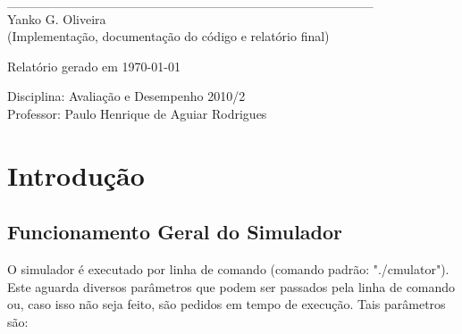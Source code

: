 \documentclass[a4paper,10pt]{article}
\begin{document}
\begin{titlepage}
\begin{center}
\vspace{0.5cm}

\_\_\_\_\_\_\_\_\_\_\_\_\_\_\_\_\_\_\_\_\_\_\_\_\_\_\_\_\_\_\_\_\_\_\_\_\_\_\_\\
Yanko G. Oliveira\\(Implementação, documentação do código e relatório final)\\

\vspace{0.5cm}

\vspace{1cm}

Relatório gerado em \today

\normalsize
\end{center}

\vfill

\begin{flushright}
Disciplina: Avaliação e Desempenho 2010/2\\
Professor: Paulo Henrique de Aguiar Rodrigues\\
\end{flushright}

\vspace{2cm}

\end{titlepage}

\pagebreak

\tableofcontents
\pagebreak

\section{Introdução}
\subsection{Funcionamento Geral do Simulador}
    O simulador é executado por linha de comando (comando padrão: "./cmulator"). Este aguarda diversos parâmetros que podem ser passados pela linha de comando ou, caso isso não seja feito, são pedidos em tempo de execução. Tais parâmetros são:
\end{document}
